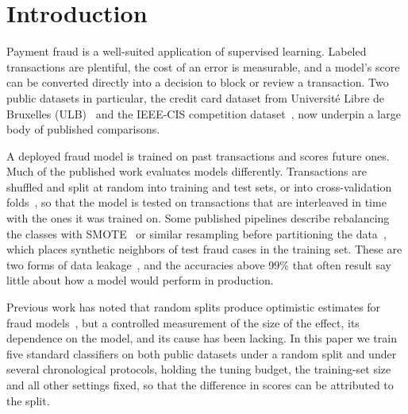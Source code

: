 \section{Introduction}

Payment fraud is a well-suited application of supervised learning. Labeled transactions are plentiful, the cost of an error is measurable, and a model's score can be converted directly into a decision to block or review a transaction. Two public datasets in particular, the credit card dataset from Universit\'e Libre de Bruxelles (ULB)~\cite{dalpozzolo2015calibrating} and the IEEE-CIS competition dataset~\cite{ieeecis2019fraud}, now underpin a large body of published comparisons.

A deployed fraud model is trained on past transactions and scores future ones. Much of the published work evaluates models differently. Transactions are shuffled and split at random into training and test sets, or into cross-validation folds~\cite{esenogho2022neural,alfaiz2022enhanced,mim2024soft,du2024novel}, so that the model is tested on transactions that are interleaved in time with the ones it was trained on. Some published pipelines describe rebalancing the classes with SMOTE~\cite{chawla2002smote} or similar resampling before partitioning the data~\cite{ileberi2021performance,khalid2024enhancing}, which places synthetic neighbors of test fraud cases in the training set. These are two forms of data leakage~\cite{kaufman2012leakage,kapoor2023leakage}, and the accuracies above 99\% that often result say little about how a model would perform in production.

Previous work has noted that random splits produce optimistic estimates for fraud models~\cite{grover2022fraud,breskuviene2024enhancing,hayat2025data}, but a controlled measurement of the size of the effect, its dependence on the model, and its cause has been lacking. In this paper we train five standard classifiers on both public datasets under a random split and under several chronological protocols, holding the tuning budget, the training-set size and all other settings fixed, so that the difference in scores can be attributed to the split.

